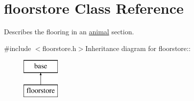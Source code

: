 \hypertarget{classfloorstore}{
\section{floorstore Class Reference}
\label{classfloorstore}
}


Describes the flooring in an \hyperlink{classanimal}{animal} section.  


{\ttfamily \#include $<$floorstore.h$>$}Inheritance diagram for floorstore::\begin{figure}[H]
\begin{center}
\leavevmode
\includegraphics[height=2cm]{classfloorstore}
\end{center}
\end{figure}
